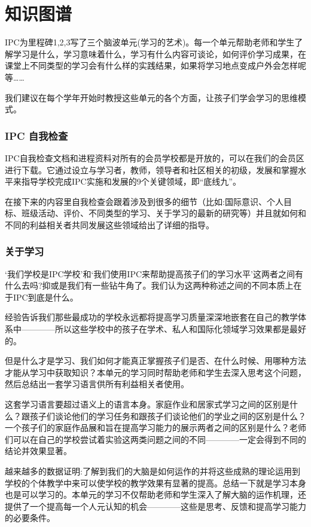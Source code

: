 \chapter{知识图谱}
    IPC为里程碑1,2,3写了三个脑波单元(学习的艺术)。每一个单元帮助老师和学生了解学习是什么，学习意味着什么，学习有什么内容可谈论，如何评价学习成果，在课堂上不同类型的学习会有什么样的实践结果，如果将学习地点变成户外会怎样呢等……
\par
    我们建议在每个学年开始时教授这些单元的各个方面，让孩子们学会学习的思维模式。\par
\subsection{IPC 自我检查}
    IPC自我检查文档和进程资料对所有的会员学校都是开放的，可以在我们的会员区进行下载。它通过设立与学习者，教师，领导者和社区相关的初级，发展和掌握水平来指导学校完成IPC实施和发展的9个关键领域，即“底线九”。\par
    在接下来的内容里自我检查会跟着涉及到很多的细节（比如:国际意识、个人目标、班级活动、评价、不同类型的学习、关于学习的最新的研究等）并且就如何和不同的利益相关者共同发展这些领域给出了详细的指导。

\subsection{关于学习}
    ‘我们学校是IPC学校’和‘我们使用IPC来帮助提高孩子们的学习水平’这两者之间有什么去吗?抑或是我们有一些钻牛角了。我们认为这两种称述之间的不同本质上在于IPC到底是什么。 \par
     经验告诉我们那些最成功的学校永远都将提高学习质量深深地嵌套在自己的教学体系中————所以这些学校中的孩子在学术、私人和国际化领域学习效果都是最好的。\par
     但是什么才是学习、我们如何才能真正掌握孩子们是否、在什么时候、用哪种方法才能从学习中获取知识？本单元的学习同时帮助老师和学生去深入思考这个问题，然后总结出一套学习语言供所有利益相关者使用。  \par
     这套学习语言要超过语义上的语言本身。家庭作业和居家式学习之间的区别是什么？跟孩子们谈论他们的学习任务和跟孩子们谈论他们的学业之间的区别是什么？一个孩子们的家庭作品展和旨在提高学习能力的展示两者之间的区别是什么？老师们可以在自己的学校尝试着实验这两类问题之间的不同————一定会得到不同的结论并效果显著。\par
     越来越多的数据证明:了解到我们的大脑是如何运作的并将这些成熟的理论运用到学校的个体教学中来可以使学校的教学效果有显著的提高。总结一下就是学习本身也是可以学习的。本单元的学习不仅帮助老师和学生深入了解大脑的运作机理，还提供了一个提高每一个人元认知的机会————这些是思考、反馈和提高学习能力的必要条件。 \par
 
